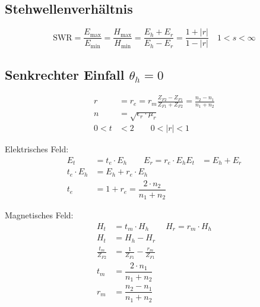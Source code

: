 \subsection{Stehwellenverhältnis}
\[
    \mathrm{SWR} = \frac{E_{\max}}{E_{\min}}=\frac{H_{\max}}{H_{\min}}=\frac{E_{h}+E_{r}}{E_{h}-E_{r}} = \frac{1+|r|}{1-|r|} \quad 1<s<\infty
\]

\subsection[Senkrechter Einfall]{Senkrechter Einfall $ \theta_h = 0$ }



\begin{align*}
    r  &= r_e = r_m\frac{Z_{F2} - Z_{F1}}{Z_{F1} + Z_{F2}} = \frac{n_2 - n_1}{n_1 + n_2}\\
    n &= \sqrt{\epsilon_r \cdot \mu_r} \\
    0<t&<2 \qquad 0<|r|<1
\end{align*}

Elektrisches Feld:   
\begin{align*}
    E_t &= t_e \cdot E_h \qquad E_r = r_e \cdot E_h
    E_t          & = E_h + E_r             \\
    t_e\cdot E_{h} & = E_{h} + r_e\cdot  E_{h} \\
    t_e            & = 1+ r_e = \dfrac{2 \cdot n_2}{n_1 + n_2}
\end{align*}

Magnetisches Feld:
\begin{align*}
    H_t &= t_m \cdot H_h \qquad H_r = r_m \cdot H_h     	                            \\
    H_t                         & = H_h - H_r                                           \\
    \frac{t_m}{Z_{F2}}            & = \frac{1}{Z_{F1}} - \frac{r_m}{Z_{F1}}             \\
    t_m &= \dfrac{2 \cdot n_1}{n_1 + n_2}                                               \\
    r_m &= \dfrac{n_2 - n_1}{n_1 + n_2}
\end{align*}




